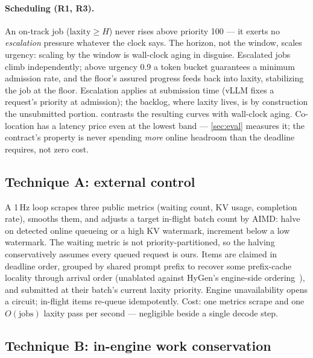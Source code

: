 \documentclass[conference]{IEEEtran}
\begin{document}
\paragraph{Scheduling (R1, R3).} An on-track job ($\mathrm{laxity} \ge H$) never rises
above priority 100 --- it exerts no \emph{escalation} pressure whatever the clock says.
The horizon, not the window, scales urgency: scaling by the window is wall-clock aging in
disguise. Escalated jobs climb independently; above urgency 0.9 a token bucket guarantees
a minimum admission rate, and the floor's assured progress feeds back into laxity,
stabilizing the job at the floor. Escalation applies at submission time (vLLM fixes a
request's priority at admission); the backlog, where laxity lives, is by construction the
unsubmitted portion.  contrasts the resulting curves with wall-clock
aging. Co-location has a latency price even at the lowest band ---
\cref{sec:eval} measures it; the contract's property is never spending \emph{more}
online headroom than the deadline requires, not zero cost.



\subsection{Technique A: external control}
\label{sec:tech-a}

A 1\,Hz loop scrapes three public metrics (waiting count, KV usage, completion rate),
smooths them, and adjusts a target in-flight batch count by AIMD: halve on detected
online queueing or a high KV watermark, increment below a low watermark. The waiting
metric is not priority-partitioned, so the halving conservatively assumes every queued
request is ours. Items are claimed in deadline order, grouped by shared prompt prefix to
recover some prefix-cache locality through arrival order (unablated against HyGen's
engine-side ordering~\citep{hygen}), and submitted at their batch's current laxity
priority. Engine unavailability opens a circuit; in-flight items re-queue idempotently.
Cost: one metrics scrape and one $O(\text{jobs})$ laxity pass per second --- negligible
beside a single decode step.

\subsection{Technique B: in-engine work conservation}
\label{sec:tech-b}
\end{document}
